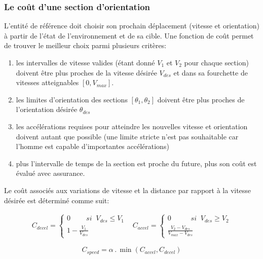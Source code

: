 \documentclass[11pt]{article}
\begin{document}
\subsubsection*{Le coût d'une section d'orientation}

L'entité de référence doit choisir son prochain déplacement (vitesse et orientation) à partir de l'état de l'environnement et de sa cible. Une fonction de coût permet de trouver le meilleur choix parmi plusieurs critères: 

\begin{enumerate}
\item les intervalles de vitesse valides (étant donné $V_1$ et $V_2$ pour chaque section) doivent être plus proches de la vitesse désirée $V_{des}$ et dans sa fourchette de vitesses atteignables $[0, V_{max}]$.
\item les limites d'orientation des sections $[\theta_1, \theta_2]$ doivent être plus proches de l'orientation désirée $\theta_{des}$
\item les accélérations requises pour atteindre les nouvelles vitesse et orientation doivent autant que possible (une limite stricte n'est pas souhaitable car l'homme est capable d'importantes accélérations)
\item plus l'intervalle de temps de la section est proche du future, plus son coût est évalué avec assurance.
\end{enumerate} 

Le coût associés aux variations de vitesse et la distance par rapport à la vitesse désirée est déterminé comme suit: 

\[
\begin{array}{cc}
C_{decel} = 
	\left\lbrace
		\begin{array}{c}
			0 \;\;\;\;\;\;\;\; si \;\; V_{des} \leq V_1 \\
			\!\!\!\!\!\!\!\!\!\!\!\!\!\!\!\!\!\!\!\!\!\!\!\!\!\!\!\! 1 - \frac{V_1}{V_{des}}
		\end{array}
	\right.
	&
	C_{accel} = 
	\left\lbrace
		\begin{array}{c}
			0 \;\;\;\;\;\;\;\;\;\; si \;\; V_{des} \geq V_2 \\
			\!\!\!\!\!\!\!\!\!\!\!\!\!\!\!\!\!\!\!\!\!\!\!\!\!\!\!\!\frac{V_2 - V_{des}}{V_{max} - V_{des}}
		\end{array}
	\right.
\end{array}
\]

\begin{equation}
C_{speed} = \alpha \,.\, \min(C_{accel}, C_{decel})
\end{equation}
\end{document}
